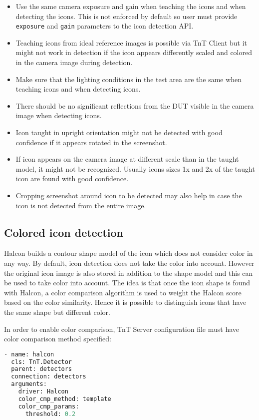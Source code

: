 \begin{itemize}
\item Use the same camera exposure and gain when teaching the icons and when detecting the icons. This is not enforced by default so user must provide \texttt{exposure} and \texttt{gain} parameters to the icon detection API.
\item Teaching icons from ideal reference images is possible via TnT Client but it might not work in detection if the icon appears differently scaled and colored in the camera image during detection.
\item Make sure that the lighting conditions in the test area are the same when teaching icons and when detecting icons.
\item There should be no significant reflections from the DUT visible in the camera image when detecting icons.
\item Icon taught in upright orientation might not be detected with good confidence if it appears rotated in the screenshot.
\item If icon appears on the camera image at different scale than in the taught model, it might not be recognized. Usually icons sizes 1x and 2x of the taught icon are found with good confidence.
\item Cropping screenshot around icon to be detected may also help in case the icon is not detected from the entire image.
\end{itemize}

\subsection{Colored icon detection}

Halcon builds a contour shape model of the icon which does not consider color in any way. By default, icon detection does not take the color into account. However the original icon image is also stored in addition to the shape model and this can be used to take color into account. The idea is that once the icon shape is found with Halcon, a color comparison algorithm is used to weight the Halcon score based on the color similarity. Hence it is possible to distinguish icons that have the same shape but different color.

In order to enable color comparison, TnT Server configuration file must have color comparison method specified:

\begin{lstlisting}[language=Python]
- name: halcon
  cls: TnT.Detector
  parent: detectors
  connection: detectors
  arguments:
    driver: Halcon
    color_cmp_method: template
    color_cmp_params:
      threshold: 0.2
\end{lstlisting}

